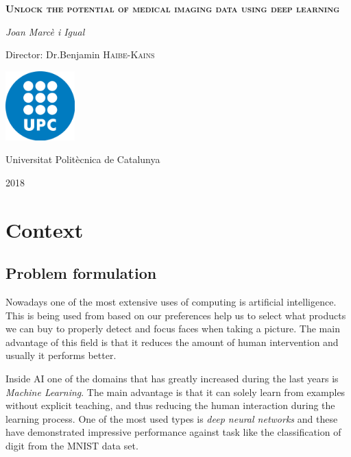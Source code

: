 \documentclass[a4paper, 12pt]{article}
\begin{document}
\begin{titlepage}
    \centering
	\vspace{1.5cm}
	{\huge \textbf{\textsc{Unlock the potential of medical imaging data using deep learning}} \par}
	\vspace{2cm}
	{\Large \textit{Joan Marcè i Igual}\par}
	\vfill
    Director: Dr.Benjamin \textsc{Haibe-Kains}
    
    \vfill

    \includegraphics[width=0.2\textwidth]{images/logo_upc}\par\vspace{1cm}
	\vfill
    
    {\LARGE Universitat Politècnica de Catalunya \par}
    {\LARGE 2018 \par}
\end{titlepage}

\tableofcontents

\pagebreak
\section{Context}

\subsection{Problem formulation}

Nowadays one of the most extensive uses of computing is artificial intelligence. This is being
used from based on our preferences help us to select what products we can buy to properly detect
and focus faces when taking a picture. The main advantage of this field is that it reduces the
amount of human intervention and usually it performs better.

Inside AI one of the domains that has greatly increased during the last years is 
\emph{Machine Learning}. The main advantage is that it can solely learn from examples without 
explicit teaching, and thus reducing the human interaction during the learning process. One of the 
most used types is \emph{deep neural networks} and these have demonstrated impressive performance 
against task like the classification of digit from the MNIST data set.
~\cites{MNIST}{empirical-evaluation-deep-architectures}
\end{document}
